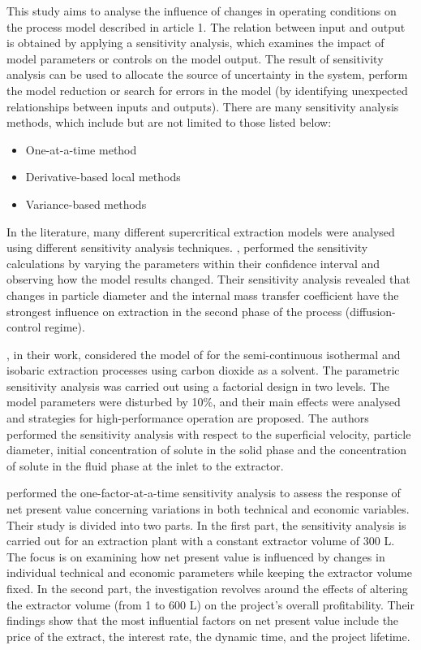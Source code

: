\documentclass[../Article_Sensitivity_Analsysis.tex]{subfiles}
\begin{document}
	
	This study aims to analyse the influence of changes in operating conditions on the process model described in {\color{red}article 1}. The relation between input and output is obtained by applying a sensitivity analysis, which examines the impact of model parameters or controls on the model output. The result of sensitivity analysis can be used to allocate the source of uncertainty in the system, perform the model reduction or search for errors in the model (by identifying unexpected relationships between inputs and outputs). There are many sensitivity analysis methods, which include but are not limited to those listed below:
	
	\begin{itemize}
		\item One-at-a-time method
		\item Derivative-based local methods
		\item Variance-based methods
	\end{itemize}
	
	In the literature, many different supercritical extraction models were analysed using different sensitivity analysis techniques. \citet{Fiori_2007}, performed the sensitivity calculations by varying the parameters within their confidence interval and observing how the model results changed. Their sensitivity analysis revealed that changes in particle diameter and the internal mass transfer coefficient have the strongest influence on extraction in the second phase of the process (diffusion-control regime).%
	
	\citet{Santos2000}, in their work, considered the model of \citet{Sovova1994} for the semi-continuous isothermal and isobaric extraction processes using carbon dioxide as a solvent. The parametric sensitivity analysis was carried out using a factorial design in two levels. The model parameters were disturbed by 10\%, and their main effects were analysed and strategies for high-performance operation are proposed. The authors performed the sensitivity analysis with respect to the superficial velocity, particle diameter, initial concentration of solute in the solid phase and the concentration of solute in the fluid phase at the inlet to the extractor.
	
	\citet{Hatami2024} performed the one-factor-at-a-time sensitivity analysis to assess the response of net present value concerning variations in both technical and economic variables. Their study is divided into two parts. In the first part, the sensitivity analysis is carried out for an extraction plant with a constant extractor volume of 300 L. The focus is on examining how net present value is influenced by changes in individual technical and economic parameters while keeping the extractor volume fixed. In the second part, the investigation revolves around the effects of altering the extractor volume (from 1 to 600 L) on the project's overall profitability. Their findings show that the most influential factors on net present value include the price of the extract, the interest rate, the dynamic time, and the project lifetime.
	
\end{document}
